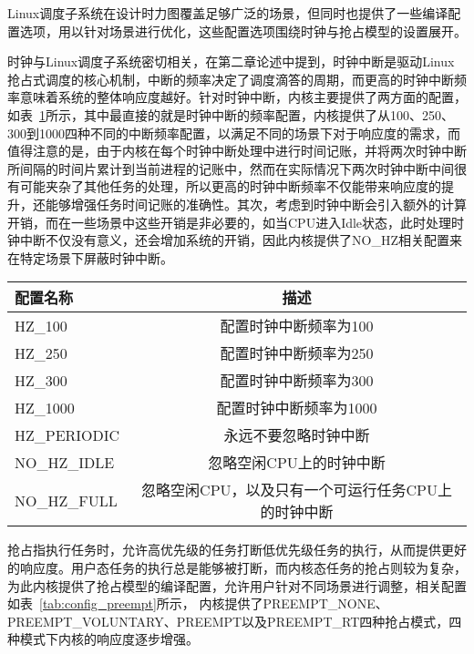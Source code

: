 Linux调度子系统在设计时力图覆盖足够广泛的场景，但同时也提供了一些编译配置选项，用以针对场景进行优化，这些配置选项围绕时钟与抢占模型的设置展开。

时钟与Linux调度子系统密切相关，在第二章论述中提到，时钟中断是驱动Linux抢占式调度的核心机制，中断的频率决定了调度滴答的周期，而更高的时钟中断频率意味着系统的整体响应度越好。针对时钟中断，内核主要提供了两方面的配置，如表~\ref{tab:config_hz}所示，其中最直接的就是时钟中断的频率配置，内核提供了从100、250、300到1000四种不同的中断频率配置，以满足不同的场景下对于响应度的需求，而值得注意的是，由于内核在每个时钟中断处理中进行时间记账，并将两次时钟中断所间隔的时间片累计到当前进程的记账中，然而在实际情况下两次时钟中断中间很有可能夹杂了其他任务的处理，所以更高的时钟中断频率不仅能带来响应度的提升，还能够增强任务时间记账的准确性。其次，考虑到时钟中断会引入额外的计算开销，而在一些场景中这些开销是非必要的，如当CPU进入Idle状态，此时处理时钟中断不仅没有意义，还会增加系统的开销，因此内核提供了NO_HZ相关配置来在特定场景下屏蔽时钟中断。

\begin{table}
    \label{tab:config_hz}
    \footnotesize%
    \setlength{\tabcolsep}{4pt}%
    \renewcommand{\arraystretch}{1.5}%
    \centering
    \begin{tabular}{lc}
        \hline
        配置名称 & 描述 \\
        \hline
        HZ_100  & 配置时钟中断频率为100  \\
        HZ_250  & 配置时钟中断频率为250 \\
        HZ_300  & 配置时钟中断频率为300 \\
        HZ_1000 & 配置时钟中断频率为1000 \\
        HZ_PERIODIC & 永远不要忽略时钟中断 \\
        NO_HZ_IDLE & 忽略空闲CPU上的时钟中断 \\
        NO_HZ_FULL & 忽略空闲CPU，以及只有一个可运行任务CPU上的时钟中断 \\
        \hline
    \end{tabular}
\end{table}

抢占指执行任务时，允许高优先级的任务打断低优先级任务的执行，从而提供更好的响应度。用户态任务的执行总是能够被打断，而内核态任务的抢占则较为复杂，为此内核提供了抢占模型的编译配置，允许用户针对不同场景进行调整，相关配置如表~\ref{tab:config_preempt}所示， 内核提供了PREEMPT_NONE、PREEMPT_VOLUNTARY、PREEMPT以及PREEMPT_RT四种抢占模式，四种模式下内核的响应度逐步增强。

